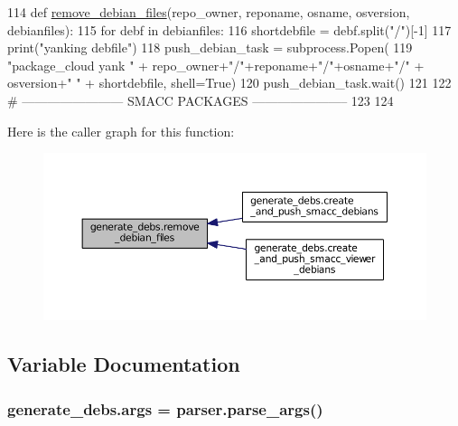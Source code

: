 \begin{DoxyCode}
114 \textcolor{keyword}{def }\hyperlink{namespacegenerate__debs_a08095040d038b3613ad0e77fd4e7f60e}{remove\_debian\_files}(repo\_owner, reponame,  osname, osversion, debianfiles):
115     \textcolor{keywordflow}{for} debf \textcolor{keywordflow}{in} debianfiles:
116         shortdebfile = debf.split(\textcolor{stringliteral}{"/"})[-1]
117         print(\textcolor{stringliteral}{"yanking debfile"})
118         push\_debian\_task = subprocess.Popen(
119             \textcolor{stringliteral}{"package\_cloud yank "} + repo\_owner+\textcolor{stringliteral}{"/"}+reponame+\textcolor{stringliteral}{"/"}+osname+\textcolor{stringliteral}{"/"} + osversion+\textcolor{stringliteral}{" "} + shortdebfile, 
      shell=\textcolor{keyword}{True})
120         push\_debian\_task.wait()
121 
122 \textcolor{comment}{# ------------------------ SMACC PACKAGES -----------------------}
123 
124 
\end{DoxyCode}


Here is the caller graph for this function\+:
\nopagebreak
\begin{figure}[H]
\begin{center}
\leavevmode
\includegraphics[width=350pt]{namespacegenerate__debs_a08095040d038b3613ad0e77fd4e7f60e_icgraph}
\end{center}
\end{figure}




\subsection{Variable Documentation}
\subsubsection[{\texorpdfstring{args}{args}}]{\setlength{\rightskip}{0pt plus 5cm}generate\+\_\+debs.\+args = parser.\+parse\+\_\+args()}\hypertarget{namespacegenerate__debs_a75f9143e38df82d83b2e8a6f99cae02c}{}\label{namespacegenerate__debs_a75f9143e38df82d83b2e8a6f99cae02c}



